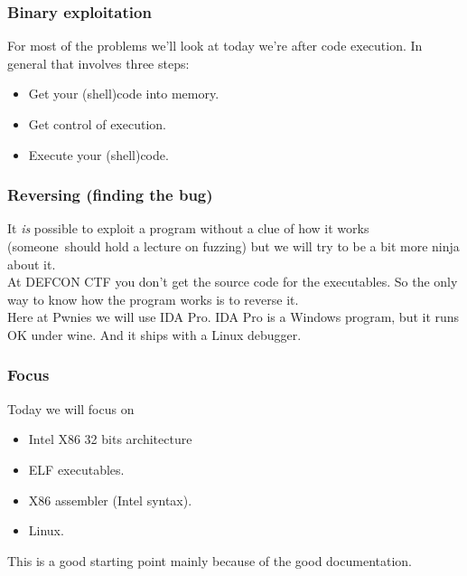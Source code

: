 \documentclass[slidestop,compress,mathserif, xcolor=table]{beamer}
\begin{document}
\begin{frame}
  \frametitle{Binary exploitation}

  For most of the problems we'll look at today we're after code execution. In
  general that involves three steps:
  \begin{itemize}
  \item \alert<1>{Get your (shell)code into memory.}
  \item \alert<2>{Get control of execution.}
  \item \alert<3>{Execute your (shell)code.}
  \end{itemize}



\end{frame}

\begin{frame}
  \frametitle{Reversing (finding the bug)}

  It \emph{is} possible to exploit a program without a clue of how it works
  (someone\texttrademark\ should hold a lecture on fuzzing) but we will try to
  be a bit more ninja about it.\\[1em]

  At DEFCON CTF you don't get the source code for the executables. So the only
  way to know how the program works is to reverse it.\\[1em]

  Here at Pwnies we will use IDA Pro. IDA Pro is a Windows program, but it runs
  OK under wine. And it ships with a Linux debugger.
\end{frame}

\begin{frame}
  \frametitle{Focus}

  Today we will focus on
  \begin{itemize}
  \item Intel X86 32 bits architecture
  \item ELF executables.
  \item X86 assembler (Intel syntax).
  \item Linux.
  \end{itemize}

  This is a good starting point mainly because of the good documentation.
\end{frame}
\end{document}
